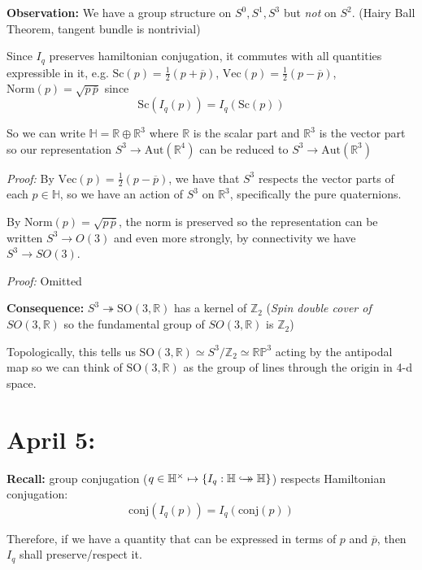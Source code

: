 \documentclass[12pt]{article}
\newcommand{\R}{\mathbb{R}}
\newcommand{\Z}{\mathbb{Z}}
\renewcommand{\H}{\mathbb{H}}
\newcommand{\RP}{\mathbb{RP}}
\newcommand{\SO}{\text{SO}}
\newcommand{\biject}{\hookrightarrow \hspace{-8pt} \rightarrow}
\newcommand{\Aut}{\text{Aut}}
\newcommand{\conj}{\text{conj}}
\renewcommand{\bar}{\overline}
\newenvironment*{tbox}[2][gray]{
    \begin{tcolorbox}[
        parbox=false,
        colback=#1!5!white,
        colframe=#1!75!black,
        breakable,
        title={#2}
    ]}
    {\end{tcolorbox}}
\begin{document}
    \textbf{Observation:} We have a group structure on $S^0, S^1, S^3$ but \emph{not} on $S^2$. (Hairy Ball Theorem, tangent bundle is nontrivial) 

    Since $I_q$ preserves hamiltonian conjugation, it commutes with all quantities expressible in it, e.g. $\text{Sc}(p) = \frac{1}{2}(p + \bar p)$,  $\text{Vec}(p) = \frac{1}{2}(p - \bar p)$, $\text{Norm}(p) = \sqrt{p \, \bar p}$ since 
    \[\text{Sc}(I_q(p)) = I_q(\text{Sc}(p))\]

    So we can write $\H = \R \oplus \R^3$ where $\R$ is the scalar part and $\R^3$ is the vector part so our representation $S^3 \to \Aut(\R^4)$ can be reduced to $S^3 \to \Aut(\R^3)$ 

    \emph{Proof:} By $\text{Vec}(p) = \frac{1}{2}(p - \bar p)$, we have that $S^3$ respects the vector parts of each $p \in \H$, so we have an action of $S^3$ on $\R^3$, specifically the pure quaternions. 

    By $\text{Norm}(p) = \sqrt{p \, \bar p}$, the norm is preserved so the representation can be written $S^3 \to O(3)$ and even more strongly, by connectivity we have $S^3 \to SO(3)$.

    \begin{tbox}{\textbf{Theorem:} Let $q \in S^3$ and express $q = \cos \frac{\theta}{2} + \sin \frac{\theta}{2} u$ for $\theta \in [0, 2\pi]$ with $u$ a unit vector. Then $I_q$ acting on $\R^3$ is about the line generated by $u$ through an angle of $\theta$ (Clockwise).}
        \emph{Proof:} Omitted 

        \textbf{Consequence:} $S^3 \twoheadrightarrow \SO(3, \R)$ has a kernel of $\Z_2$ (\emph{Spin double cover of $SO(3, \R)$} so the fundamental group of $SO(3, \R)$ is $\Z_2$)

        Topologically, this tells us $\SO(3, \R) \simeq S^3/\Z_2 \simeq \RP^3$ acting by the antipodal map so we can think of $\SO(3, \R)$ as the group of lines through the origin in 4-d space. 
    \end{tbox}

\section{April 5:}
    \textbf{Recall:} group conjugation ($q \in \H^{\times} \mapsto \{I_q: \H \biject \H\}$) respects Hamiltonian conjugation: 
    \[\conj(I_q(p)) = I_q(\conj(p))\] 
    
    Therefore, if we have a quantity that can be expressed in terms of $p$ and $\bar p$, then $I_q$ shall preserve/respect it. 
\end{document}
